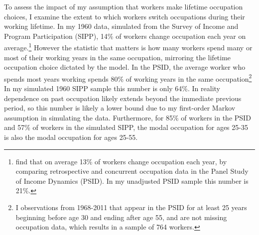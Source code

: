 \documentclass[11pt]{article}
\begin{document}



To assess the impact of my assumption that workers make lifetime occupation choices, I examine the extent to which workers switch occupations during their working lifetime. In my 1960 data, simulated from the Survey of Income and Program Participation (SIPP), 14\% of workers change occupation each year on average.\footnote{ find that on average 13\% of workers change occupation each year, by comparing retrospective and concurrent occupation data in the Panel Study of Income Dynamics (PSID). In my unadjusted PSID sample this number is 21\%.} However the statistic that matters is how many workers spend many or most of their working years in the same occupation, mirroring the lifetime occupation choice dictated by the model.  In the PSID, the average worker who spends most years working spends 80\% of working years in the same occupation\footnote{I observations from 1968-2011 that appear in the PSID for at least 25 years beginning before age 30 and ending after age 55, and are not missing occupation data, which results in a sample of 764 workers.} In my simulated 1960 SIPP sample this number is only 64\%. In reality dependence on past occupation likely extends beyond the immediate previous period, so this number is likely a lower bound due to my first-order Markov assumption in simulating the data. Furthermore, for 85\% of workers in the PSID and 57\% of workers in the simulated SIPP, the modal occupation for ages 25-35 is also the modal occupation for ages 25-55.
\end{document}
